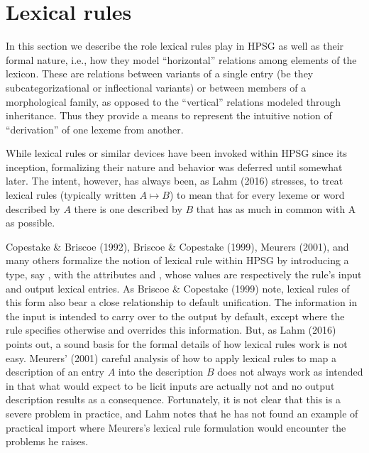 \documentclass[output=paper]{langsci/langscibook}
\begin{document}
\section{Lexical rules}

In this section we describe the role lexical rules play in HPSG as well as their formal nature, i.e., how they model ``horizontal'' relations among elements of the lexicon. These are relations between variants of a single entry (be they subcategorizational or inflectional variants) or between members of a morphological family, as opposed to the ``vertical'' relations modeled through inheritance. Thus they provide a means to represent the intuitive notion of ``derivation'' of one lexeme from another. 

While lexical rules or similar devices have been invoked within HPSG since its inception, formalizing their nature and behavior was deferred until somewhat later. 
The intent, however, has always been, as Lahm (2016) stresses, to treat lexical rules (typically written $A \mapsto B$) to mean that for every lexeme or word described by $A$ there is one described by $B$ that has as much in common with A as possible.

Copestake \& Briscoe (1992), Briscoe \& Copestake (1999), Meurers (2001), and many others formalize the notion of lexical rule within HPSG by introducing a type, say , with the attributes  and , whose values are respectively the rule's input and output lexical entries. As Briscoe \& Copestake (1999) note, lexical rules of this form also bear a close relationship to default unification.
The information in the input is intended to carry over to the output by default, except where the rule specifies otherwise and overrides this information. But, as Lahm (2016) points out, a sound basis for the formal details of how lexical rules work is not easy. Meurers' (2001) careful analysis of how to apply lexical rules to map a description of an entry $A$ into the description $B$ does not always work as intended in that what would expect to be licit inputs are actually not and no output description results as a consequence. Fortunately,  it is not clear that this is a severe problem in practice, and Lahm notes that he has not found an example of practical import where Meurers's lexical rule formulation would encounter the problems he raises.
\end{document}
